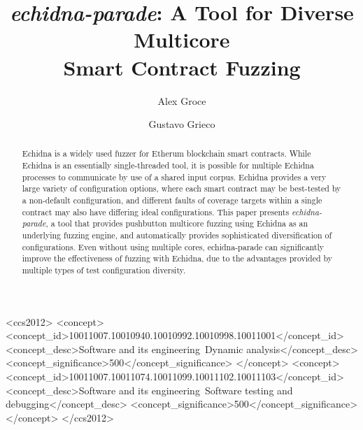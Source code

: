 \documentclass[sigconf]{acmart}
\begin{document}
\title{\emph{echidna-parade}: A Tool for Diverse Multicore\\Smart Contract Fuzzing}

\author{Alex Groce}
\author{Gustavo Grieco}


\renewcommand{\shortauthors}{Groce and Grieco}

\begin{abstract}
Echidna is a widely used fuzzer for Etherum blockchain smart
contracts.  While Echidna is an essentially single-threaded tool, it
is possible for multiple Echidna processes to communicate by use of a shared
input corpus.  Echidna provides a very large variety of configuration
options, where each smart contract may be best-tested by a non-default
configuration, and different faults of coverage targets within a
single contract may also have differing ideal configurations.  This
paper presents \emph{echidna-parade}, a tool that provides pushbutton
multicore fuzzing using Echidna as an underlying fuzzing engine, and
automatically provides sophisticated diversification of
configurations.   Even without using multiple cores, echidna-parade
can significantly improve the effectiveness of fuzzing with Echidna,
due to the advantages provided by multiple types of test configuration diversity.
\end{abstract}

\begin{CCSXML}
<ccs2012>
<concept>
<concept_id>10011007.10010940.10010992.10010998.10011001</concept_id>
<concept_desc>Software and its engineering~Dynamic analysis</concept_desc>
<concept_significance>500</concept_significance>
</concept>
<concept>
<concept_id>10011007.10011074.10011099.10011102.10011103</concept_id>
<concept_desc>Software and its engineering~Software testing and debugging</concept_desc>
<concept_significance>500</concept_significance>
</concept>
</ccs2012>
\end{CCSXML}
\end{document}
